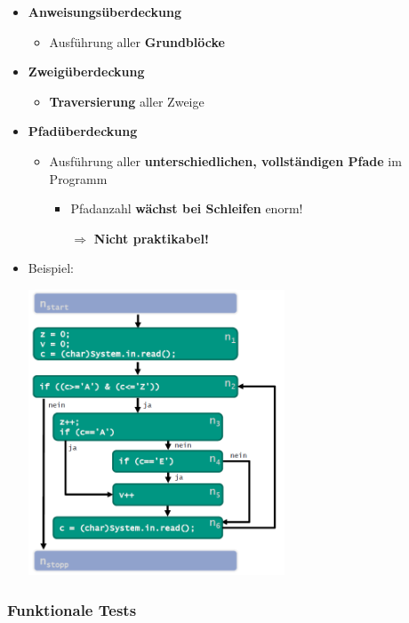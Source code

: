 \documentclass[parskip=full, 12pt]{scrartcl}
\begin{document}
				\begin{itemize}
					\item \textbf{Anweisungsüberdeckung}
					\begin{itemize}
						\item Ausführung aller \textbf{Grundblöcke}
					\end{itemize}
					\item \textbf{Zweigüberdeckung}
					\begin{itemize}
						\item \textbf{Traversierung} aller Zweige
					\end{itemize}
					\item \textbf{Pfadüberdeckung}
					\begin{itemize}
						\item Ausführung aller \textbf{unterschiedlichen, vollständigen Pfade} im Programm
						\begin{itemize}
							\item Pfadanzahl \textbf{wächst bei Schleifen} enorm!
							
							$\Rightarrow$ \textbf{Nicht praktikabel!}
						\end{itemize}
					\end{itemize}
					\item Beispiel:
					\begin{center}
						\includegraphics[width=0.6\textwidth]{../images/kfg.png}
					\end{center}
				\end{itemize}
	
			\subsubsection{Funktionale Tests}
	
\end{document}
